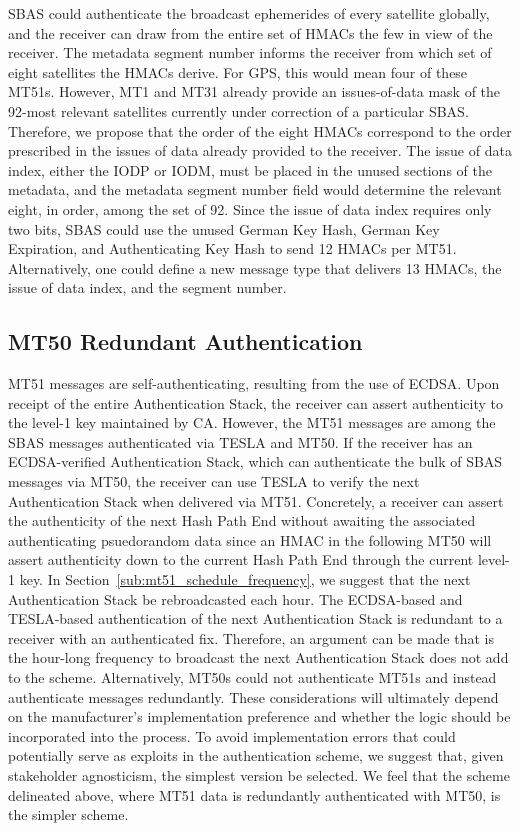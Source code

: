 \documentclass[APA,STIX1COL]{IONjournal/ION-APA Template}
\begin{document}
		SBAS could authenticate the broadcast ephemerides of every satellite globally, and the receiver can draw from the entire set of HMACs the few in view of the receiver.
		The metadata segment number informs the receiver from which set of eight satellites the HMACs derive.
		For GPS, this would mean four of these MT51s.
		However, MT1 and MT31 already provide an issues-of-data mask of the 92-most relevant satellites currently under correction of a particular SBAS.
		Therefore, we propose that the order of the eight HMACs correspond to the order prescribed in the issues of data already provided to the receiver.
		The issue of data index, either the IODP or IODM, must be placed in the unused sections of the metadata, and the metadata segment number field would determine the relevant eight, in order, among the set of 92.
		Since the issue of data index requires only two bits, SBAS could use the unused German Key Hash, German Key Expiration, and Authenticating Key Hash to send 12 HMACs per MT51.
		Alternatively, one could define a new message type that delivers 13 HMACs, the issue of data index, and the segment number.

	\subsection{MT50 Redundant Authentication} \label{sub:mt50_redundant_authentication}

		MT51 messages are self-authenticating, resulting from the use of ECDSA.
		Upon receipt of the entire Authentication Stack, the receiver can assert authenticity to the level-1 key maintained by CA.
		However, the MT51 messages are among the SBAS messages authenticated via TESLA and MT50.
		If the receiver has an ECDSA-verified Authentication Stack, which can authenticate the bulk of SBAS messages via MT50, the receiver can use TESLA to verify the next Authentication Stack when delivered via MT51.
		Concretely, a receiver can assert the authenticity of the next Hash Path End without awaiting the associated authenticating psuedorandom data since an HMAC in the following MT50 will assert authenticity down to the current Hash Path End through the current level-1 key.
		In Section~\ref{sub:mt51_schedule_frequency}, we suggest that the next Authentication Stack be rebroadcasted each hour.
		The ECDSA-based and TESLA-based authentication of the next Authentication Stack is redundant to a receiver with an authenticated fix.
		Therefore, an argument can be made that is the hour-long frequency to broadcast the next Authentication Stack does not add to the scheme.
		Alternatively, MT50s could not authenticate MT51s and instead authenticate messages redundantly.
		These considerations will ultimately depend on the manufacturer's implementation preference and whether the logic should be incorporated into the process.
		To avoid implementation errors that could potentially serve as exploits in the authentication scheme, we suggest that, given stakeholder agnosticism, the simplest version be selected.
		We feel that the scheme delineated above, where MT51 data is redundantly authenticated with MT50, is the simpler scheme.
\end{document}

